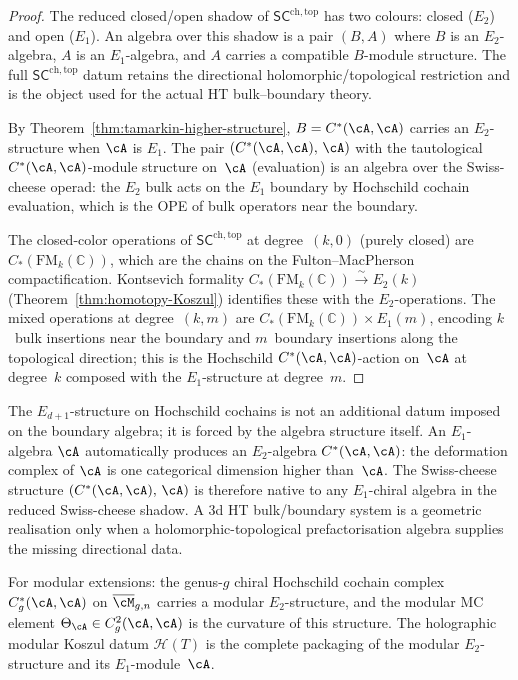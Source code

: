 \begin{proof}
The reduced closed/open shadow of
$\mathsf{SC}^{\mathrm{ch,top}}$ has two colours: closed
\textup{(}$E_2$\textup{)} and open \textup{(}$E_1$\textup{)}. An algebra over
this shadow is a pair $(B,A)$ where $B$ is an $E_2$-algebra, $A$ is an
$E_1$-algebra, and $A$ carries a compatible $B$-module structure. The
full $\mathsf{SC}^{\mathrm{ch,top}}$ datum retains the directional
holomorphic/topological restriction and is the object used for the
actual HT bulk--boundary theory.

By Theorem~\ref{thm:tamarkin-higher-structure}, $B=C^*(\cA,\cA)$
carries an $E_2$-structure when $\cA$ is $E_1$. The pair
$(C^*(\cA,\cA),\,\cA)$ with the tautological $C^*(\cA,\cA)$-module
structure on~$\cA$ (evaluation) is an algebra over the Swiss-cheese
operad: the $E_2$ bulk acts on the $E_1$ boundary by
Hochschild cochain evaluation, which is the OPE of bulk
operators near the boundary.

The closed-color operations of $\mathsf{SC}^{\mathrm{ch,top}}$
at degree~$(k,0)$ (purely closed) are
$C_*(\mathrm{FM}_k(\mathbb C))$, which are the chains on the
Fulton--MacPherson compactification. Kontsevich formality
$C_*(\mathrm{FM}_k(\mathbb C))\xrightarrow{\sim}E_2(k)$
(Theorem~\ref{thm:homotopy-Koszul}) identifies these with
the $E_2$-operations. The mixed operations at degree~$(k,m)$
are $C_*(\mathrm{FM}_k(\mathbb C))\times E_1(m)$, encoding
$k$~bulk insertions near the boundary and $m$~boundary
insertions along the topological direction; this is the
Hochschild $C^*(\cA,\cA)$-action on~$\cA$ at degree~$k$
composed with the $E_1$-structure at degree~$m$.
\end{proof}

\begin{remark}
\label{rem:two-colors-inevitable}
The $E_{d+1}$-structure on Hochschild cochains is not an
additional datum imposed on the boundary algebra; it is
forced by the algebra structure itself. An $E_1$-algebra
$\cA$ automatically produces an $E_2$-algebra
$C^*(\cA,\cA)$: the deformation complex of $\cA$ is one
categorical dimension higher than~$\cA$. The Swiss-cheese
structure $(C^*(\cA,\cA),\,\cA)$ is therefore native to any
$E_1$-chiral algebra in the reduced Swiss-cheese shadow. A 3d HT
bulk/boundary system is a geometric realisation only when a
holomorphic-topological prefactorisation algebra supplies the missing
directional data.

For modular extensions: the genus-$g$ chiral Hochschild cochain
complex $C^*_g(\cA,\cA)$ on $\overline{\cM}_{g,n}$ carries
a modular $E_2$-structure, and the modular MC element
$\Theta_\cA\in C^2_g(\cA,\cA)$ is the curvature of this
structure. The holographic modular Koszul datum
$\mathcal H(T)$ is the complete packaging of the modular
$E_2$-structure and its $E_1$-module~$\cA$.
\end{remark}

